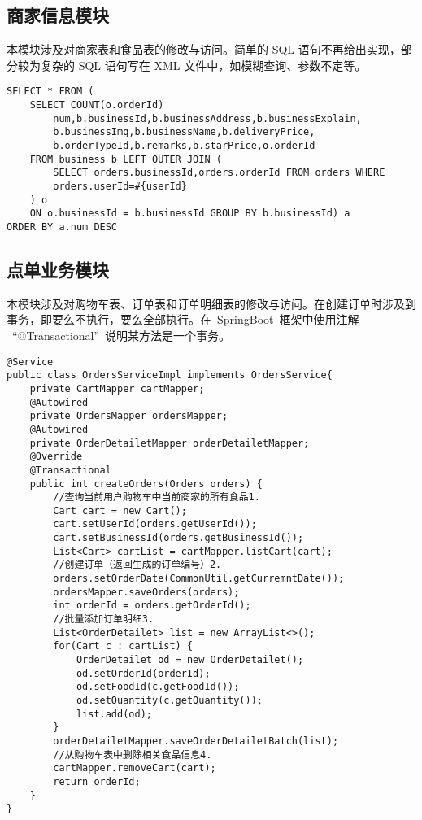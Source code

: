 \subsection{商家信息模块}
本模块涉及对商家表和食品表的修改与访问。简单的 SQL 语句不再给出实现，部分较为复杂的 SQL 语句写在 XML 文件中，如模糊查询、参数不定等。

\begin{lstlisting}[basicstyle=\footnotesize]
SELECT * FROM (
    SELECT COUNT(o.orderId)
        num,b.businessId,b.businessAddress,b.businessExplain,
        b.businessImg,b.businessName,b.deliveryPrice,
        b.orderTypeId,b.remarks,b.starPrice,o.orderId
    FROM business b LEFT OUTER JOIN (
        SELECT orders.businessId,orders.orderId FROM orders WHERE
        orders.userId=#{userId}
    ) o
    ON o.businessId = b.businessId GROUP BY b.businessId) a
ORDER BY a.num DESC
\end{lstlisting}

\subsection{点单业务模块}
本模块涉及对购物车表、订单表和订单明细表的修改与访问。在创建订单时涉及到事务，即要么不执行，要么全部执行。在~SpringBoot~框架中使用注解
~“@Transactional”~说明某方法是一个事务。

\begin{lstlisting}[basicstyle=\footnotesize]
@Service
public class OrdersServiceImpl implements OrdersService{
    private CartMapper cartMapper;
    @Autowired
    private OrdersMapper ordersMapper;
    @Autowired
    private OrderDetailetMapper orderDetailetMapper;
    @Override
    @Transactional
    public int createOrders(Orders orders) {
        //查询当前用户购物车中当前商家的所有食品1.
        Cart cart = new Cart();
        cart.setUserId(orders.getUserId());
        cart.setBusinessId(orders.getBusinessId());
        List<Cart> cartList = cartMapper.listCart(cart);
        //创建订单（返回生成的订单编号）2.
        orders.setOrderDate(CommonUtil.getCurremntDate());
        ordersMapper.saveOrders(orders);
        int orderId = orders.getOrderId();
        //批量添加订单明细3.
        List<OrderDetailet> list = new ArrayList<>();
        for(Cart c : cartList) {
            OrderDetailet od = new OrderDetailet();
            od.setOrderId(orderId);
            od.setFoodId(c.getFoodId());
            od.setQuantity(c.getQuantity());
            list.add(od);
        }
        orderDetailetMapper.saveOrderDetailetBatch(list);
        //从购物车表中删除相关食品信息4.
        cartMapper.removeCart(cart);
        return orderId;
    }
}
\end{lstlisting}

